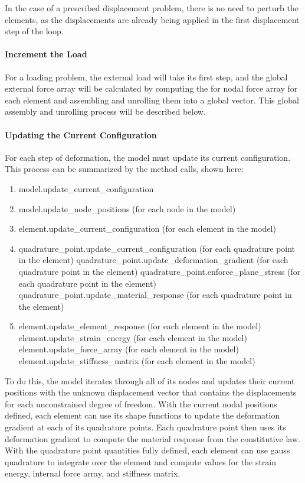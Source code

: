 \documentclass[]{spie}  %
\begin{document}
In the case of a prescribed displacement problem, there is no need to perturb the elements, as the displacements are already being applied in the first displacement step of the loop. 

\paragraph{Increment the Load}
For a loading problem, the external load will take its first step, and the global external force array will be calculated by computing the for nodal force array for each element and assembling and unrolling them into a global vector. This global assembly and unrolling process will be described below.

\paragraph{Updating the Current Configuration}
For each step of deformation, the model must update its current configuration. This process can be summarized by the method calls, shown here:
\begin{enumerate}
	\item model.update\_current\_configuration
	\item model.update\_node\_positions \hfill (for each node in the model)
	\item element.update\_current\_configuration \hfill (for each element in the model)
	\item quadrature\_point.update\_current\_configuration \hfill (for each quadrature point in the element)
	\subitem quadrature\_point.update\_deformation\_gradient \hfill (for each quadrature point in the element)
	\subitem quadrature\_point.enforce\_plane\_stress \hfill (for each quadrature point in the element)
	\subitem quadrature\_point.update\_material\_response \hfill (for each quadrature point in the element)
	\item element.update\_element\_response \hfill (for each element in the model)
	\subitem element.update\_strain\_energy \hfill (for each element in the model)
	\subitem element.update\_force\_array \hfill (for each element in the model)
	\subitem element.update\_stiffness\_matrix \hfill (for each element in the model)
\end{enumerate}

To do this, the model iterates through all of its nodes and updates their current positions with the unknown displacement vector that contains the displacements for each unconstrained degree of freedom. With the current nodal positions defined, each element can use its shape functions to update the deformation gradient at each of its quadrature points. Each quadrature point then uses its deformation gradient to compute the material response from the constitutive law. With the quadrature point quantities fully defined, each element can use gauss quadrature to integrate over the element and compute values for the strain energy, internal force array, and stiffness matrix.
\end{document}
